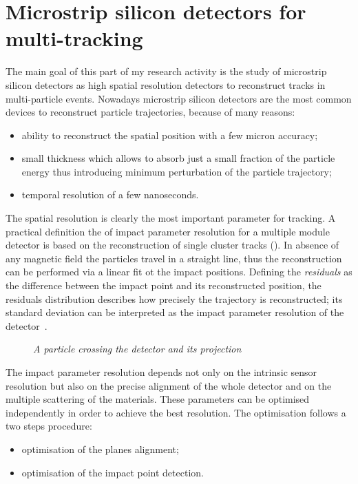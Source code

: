 \section{Microstrip silicon detectors for multi-tracking}
The main goal of this part of my research activity is the study of microstrip
silicon detectors as high spatial resolution detectors to reconstruct tracks in
multi-particle events. Nowadays microstrip silicon detectors are the most common
devices to reconstruct particle trajectories, because of many reasons:
\begin{itemize}
\item ability to reconstruct the spatial position with a few micron accuracy;
\item small thickness which allows to absorb just a small fraction of the particle energy thus
  introducing minimum perturbation of the particle trajectory;
\item temporal resolution of a few nanoseconds.
\end{itemize}
The spatial resolution is clearly the most important parameter for tracking.  A
practical definition the of impact parameter resolution for a multiple module
detector is based on the reconstruction of single cluster tracks
(). In absence of any magnetic field the
particles travel in a straight line, thus the reconstruction can be performed
via a linear fit ot the impact positions. Defining the {\em residuals} as the
difference between the impact point and its reconstructed position, the
residuals distribution describes how precisely the trajectory is reconstructed;
its standard deviation can be interpreted
as the impact parameter resolution of the detector~\cite{Turchetta:1993vu}.\\
\begin{figure}[!htbp]
\centering

\caption{{\it A particle crossing the detector and its projection}}\label{tikz:track_reconstruction}
\end{figure}
The impact parameter resolution depends not only on the intrinsic sensor
resolution but also on the precise alignment of the whole detector and on the
multiple scattering of the materials. These
parameters can be optimised independently in order to achieve the best
resolution. The optimisation follows a two steps procedure:
\begin{itemize}
\item optimisation of the planes alignment;
\item optimisation of the impact point detection.
\end{itemize}



